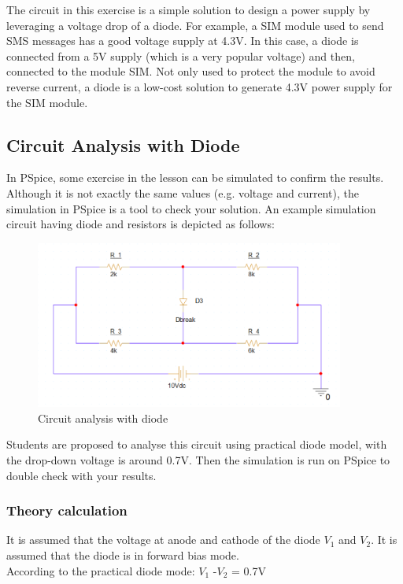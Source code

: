 The circuit in this exercise is a simple solution to design a power supply by leveraging a voltage drop of a diode. For example, a SIM module used to send SMS messages has a good voltage supply at 4.3V. In this case, a diode is connected from a 5V supply (which is a very popular voltage) and then, connected to the module SIM. Not only used to protect the module to avoid reverse current, a diode is a low-cost solution to generate 4.3V power supply for the SIM module.

\subsection{Circuit Analysis with Diode}
In PSpice, some exercise in the lesson can be simulated to confirm the results. Although it is not exactly the same values (e.g. voltage and current), the simulation in PSpice is a tool to check your solution. An example simulation circuit having diode and resistors is depicted as follows:

\begin{figure}[!htp]
    \label{pic:halfwave_rectifier3}
    \centering
    \includegraphics[width = 4in]{source/picture/bai_2/diode_10.PNG}
    \caption{Circuit analysis with diode}
    \label{lab02_ex031b}
\end{figure}

Students are proposed to analyse this circuit using practical diode model, with the drop-down voltage is around 0.7V. Then the simulation is run on PSpice to double check with your results.
\subsubsection{Theory calculation}
It is assumed that the voltage at anode and cathode of the diode $V_1$ and $V_2$. It is assumed that the diode is in forward bias mode.\\

According to the practical diode mode: $V_1$ -$V_2$ = 0.7V\\

